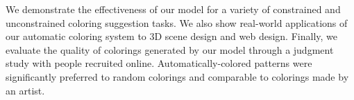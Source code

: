 We demonstrate the effectiveness of our model for a variety of constrained and unconstrained coloring suggestion tasks. We also show real-world applications of our automatic coloring system to 3D scene design and web design. Finally, we evaluate the quality of colorings generated by our model through a judgment study with people recruited online. Automatically-colored patterns were significantly preferred to random colorings and comparable to colorings made by an artist.


